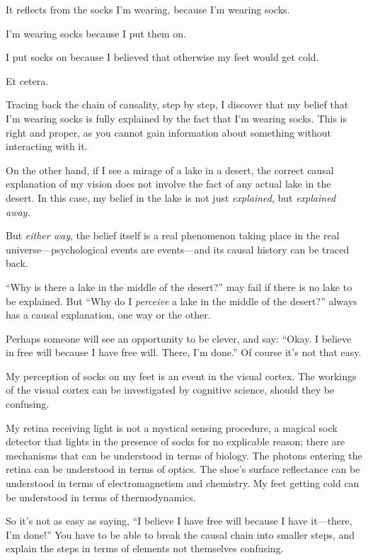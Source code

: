 {
 It reflects from the socks I'm wearing, because
I'm wearing socks.}

{
 I'm wearing socks because I put them on.}

{
 I put socks on because I believed that otherwise my feet would get
cold.}

{
 Et cetera.}

{
 Tracing back the chain of causality, step by step, I discover that
my belief that I'm wearing socks is fully explained by
the fact that I'm wearing socks. This is right and
proper, as you cannot gain information about something without
interacting with it.}

{
 On the other hand, if I see a mirage of a lake in a desert, the
correct causal explanation of my vision does not involve the fact of
any actual lake in the desert. In this case, my belief in the lake is
not just \textit{explained}, but \textit{explained away.}}

{
 But \textit{either way}, the belief itself is a real phenomenon
taking place in the real universe---psychological events are
events---and its causal history can be traced back.}

{
 ``Why is there a lake in the middle of the
desert?'' may fail if there is no lake to be
explained. But ``Why do I \textit{perceive} a lake in
the middle of the desert?'' always has a causal
explanation, one way or the other.}

{
 Perhaps someone will see an opportunity to be clever, and say:
``Okay. I believe in free will because I have free
will. There, I'm done.'' Of course
it's not that easy.}

{
 My perception of socks on my feet is an event in the visual
cortex. The workings of the visual cortex can be investigated by
cognitive science, should they be confusing.}

{
 My retina receiving light is not a mystical sensing procedure, a
magical sock detector that lights in the presence of socks for no
explicable reason; there are mechanisms that can be understood in terms
of biology. The photons entering the retina can be understood in terms
of optics. The shoe's surface reflectance can be
understood in terms of electromagnetism and chemistry. My feet getting
cold can be understood in terms of thermodynamics.}

{
 So it's not as easy as saying,
``I believe I have free will because I have
it---there, I'm done!'' You have to
be able to break the causal chain into smaller steps, and explain the
steps in terms of elements not themselves confusing.}


